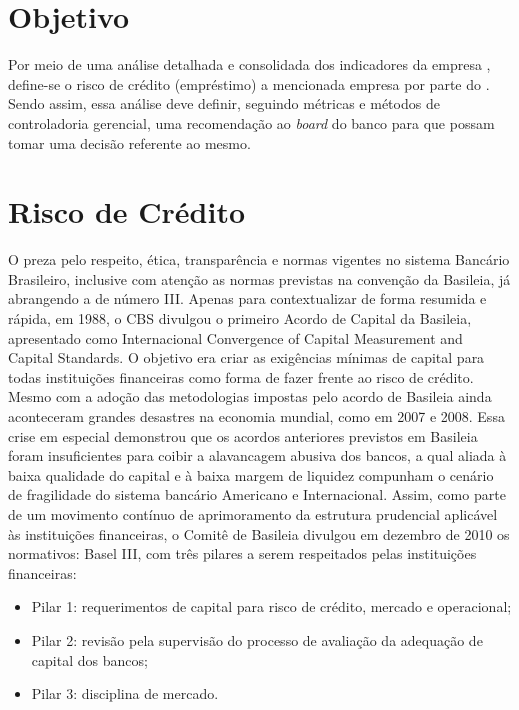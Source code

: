 \section{Objetivo}

Por meio de uma análise detalhada e consolidada dos indicadores da empresa \nomeCompletoPositivo{}, define-se o risco de crédito (empréstimo) a mencionada empresa por parte do \emph{\nomeDoBanco{}}. Sendo assim, essa análise deve definir, seguindo métricas e métodos de controladoria gerencial, uma recomendação ao \emph{board} do banco para que possam tomar uma decisão referente ao mesmo.

\section{Risco de Crédito}

O \nomeDoBanco{} preza pelo respeito, ética, transparência e normas vigentes no sistema Bancário Brasileiro, inclusive com atenção as normas previstas na convenção da Basileia, já abrangendo a de número III.
Apenas para contextualizar de forma resumida e rápida, em 1988, o CBS divulgou o primeiro Acordo de Capital da Basileia, apresentado como Internacional Convergence of Capital Measurement and Capital Standards. O objetivo era criar as exigências mínimas de capital para todas instituições financeiras como forma de fazer frente ao risco de crédito.
Mesmo com a adoção das metodologias impostas pelo acordo de Basileia ainda aconteceram grandes desastres na economia mundial, como em 2007 e 2008. Essa crise em especial demonstrou que os acordos anteriores previstos em Basileia foram insuficientes para coibir a alavancagem abusiva dos bancos, a qual aliada à baixa qualidade do capital e à baixa margem de liquidez compunham o cenário de fragilidade do sistema bancário Americano e Internacional. Assim, como parte de um movimento contínuo de aprimoramento da estrutura prudencial aplicável às instituições financeiras, o Comitê de Basileia divulgou em dezembro de 2010 os normativos: Basel III, com três pilares a serem respeitados pelas instituições financeiras:

\begin{itemize}
\item Pilar 1: requerimentos de capital para risco de crédito, mercado e operacional;
\item Pilar 2: revisão pela supervisão do processo de avaliação da adequação de capital dos bancos;
\item Pilar 3: disciplina de mercado.
\end{itemize}

